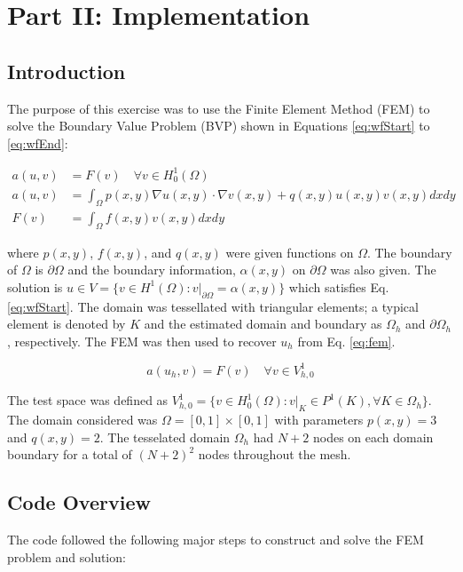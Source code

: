 \documentclass[a4paper, 12pt]{article}
\title{}
\begin{document}
\section*{Part II: Implementation} 
\subsection{Introduction}\label{sec:intro}
The purpose of this exercise was to use the Finite Element Method (FEM)
to solve the Boundary Value Problem (BVP) shown in Equations \ref{eq:wfStart}
to \ref{eq:wfEnd}:


\begin{align}
a( u, v) &= F(v) \quad \forall v \in H_0^1(\Omega) \label{eq:wfStart} \\
a( u, v) &= \int_{\Omega} p( x, y) \nabla u( x, y)  \cdot \nabla v( x, y) + q( x, y) u( x, y) v( x, y) dx dy \\
F(v)     &= \int_{\Omega} f( x, y) v( x, y) dxdy \label{eq:wfEnd}
\end{align}

\noindent
where $p(x,y)$, $f(x,y)$, and $q(x,y)$ were given functions on $\Omega$.
The boundary of $\Omega$ is $\partial \Omega$ and the boundary
information, $\alpha( x, y)$ on $\partial \Omega$ was also given.
The solution is $u \in V = \{ v\in H^1(\Omega):v\rvert_{\partial \Omega} = \alpha( x, y)\}$
which satisfies Eq. \ref{eq:wfStart}. 
The domain was tessellated with triangular elements;
a typical element is denoted by $K$ and the estimated 
domain and boundary as $\Omega_h$ and $\partial \Omega_h$, respectively.
The FEM was then used to recover $u_h$ from Eq. \ref{eq:fem}.

\begin{equation}
a( u_h, v) = F( v) \quad \forall v \in V_{h,0}^1  \label{eq:fem}
\end{equation}

\noindent
The test space was defined as
$V_{h,0}^1 = \{v \in H_0^1(\Omega): v\rvert_{K} \in P^1(K), \forall K \in \Omega_h\}$.
The domain considered was $\Omega = [0, 1] \times [0,1]$ with 
parameters $p(x,y) = 3$ and $q(x,y) = 2$.
The tesselated domain $\Omega_h$ had $N+2$ nodes
on each domain boundary for a total of $(N+2)^2$ nodes throughout the mesh.

\subsection{Code Overview} \label{ss:codeOverview}
The code followed the following major steps to 
construct and solve the FEM problem and solution:
\end{document}
